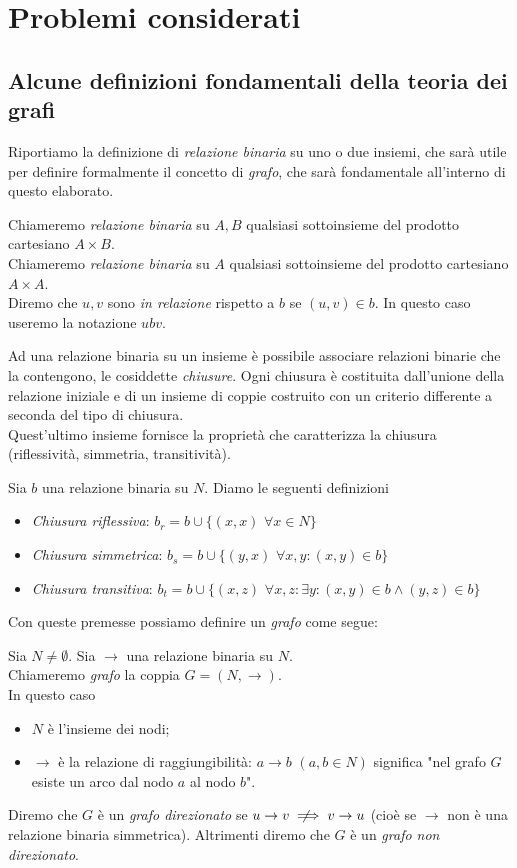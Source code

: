 \section{Problemi considerati}
\subsection{Alcune definizioni fondamentali della teoria dei grafi}
Riportiamo la definizione di \textit{relazione binaria} su uno o due insiemi, che sarà utile per definire formalmente il concetto di \textit{grafo}, che sarà fondamentale all'interno di questo elaborato.
\begin{definition}
    Chiameremo \textit{relazione binaria} su $A,B$ qualsiasi sottoinsieme del prodotto cartesiano $A \times B$.\\
    Chiameremo \textit{relazione binaria} su $A$ qualsiasi sottoinsieme del prodotto cartesiano $A \times A$.\\
    Diremo che $u,v$ sono \textit{in relazione} rispetto a $b$ se $(u,v) \in b$. In questo caso useremo la notazione $u b v$.
\end{definition}
Ad una relazione binaria su un insieme è possibile associare relazioni binarie che la contengono, le cosiddette \textit{chiusure}.
Ogni chiusura è costituita dall'unione della relazione iniziale e di un insieme di coppie costruito con un criterio differente a seconda del tipo di chiusura.\\
Quest'ultimo insieme fornisce la proprietà che caratterizza la chiusura (riflessività, simmetria, transitività).
\begin{definition}
    Sia $b$ una relazione binaria su $N$.
    Diamo le seguenti definizioni
    \begin{itemize}
        \item \textit{Chiusura riflessiva}: $b_r = b \cup \{(x,x) \,\, \forall x \in N\}$
        \item \textit{Chiusura simmetrica}: $b_s = b \cup \{(y,x) \,\, \forall x,y : (x,y) \in b\}$
        \item \textit{Chiusura transitiva}: $b_t = b \cup \{(x,z) \,\, \forall x,z : \exists y : (x,y) \in b \land (y,z) \in b\}$
    \end{itemize}
\end{definition}
Con queste premesse possiamo definire un \textit{grafo} come segue:
\begin{definition}
    Sia $N \neq \emptyset$. Sia $\to$ una relazione binaria su $N$.\\
    Chiameremo \textit{grafo} la coppia $G = (N, \to)$.\\
    In questo caso
    \begin{itemize}
        \item $N$ è l'insieme dei nodi;
        \item $\to$ è la relazione di raggiungibilità: $a \to b \,\,(a,b \in N)$ significa "nel grafo $G$ esiste un arco dal nodo $a$ al nodo $b$".
    \end{itemize}
    Diremo che $G$ è un \textit{grafo direzionato} se $u \to v \notimplies v \to u$ (cioè se $\to$ non è una relazione binaria simmetrica). Altrimenti diremo che $G$ è un \textit{grafo non direzionato}.
\end{definition}
